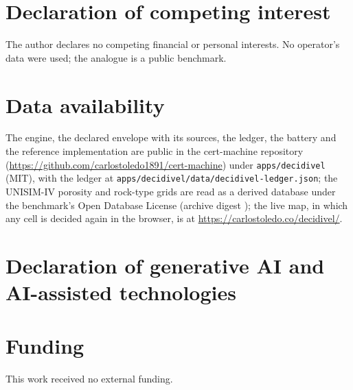 \documentclass[preprint,11pt,authoryear]{elsarticle}
\begin{document}
\section*{Declaration of competing interest}
The author declares no competing financial or personal interests. No operator's data were used; the analogue is a public benchmark.

\section*{Data availability}
The engine, the declared envelope with its sources, the ledger, the battery and the reference implementation are public in the cert-machine repository (\url{https://github.com/carlostoledo1891/cert-machine}) under \texttt{apps/decidivel} (MIT), with the ledger at \texttt{apps/decidivel/data/decidivel-ledger.json}; the UNISIM-IV porosity and rock-type grids are read as a derived database under the benchmark's Open Database License (archive digest \DUnisimSha); the live map, in which any cell is decided again in the browser, is at \url{https://carlostoledo.co/decidivel/}.

\section*{Declaration of generative AI and AI-assisted technologies}
\cmaideclaration

\section*{Funding}
This work received no external funding.
\end{document}
